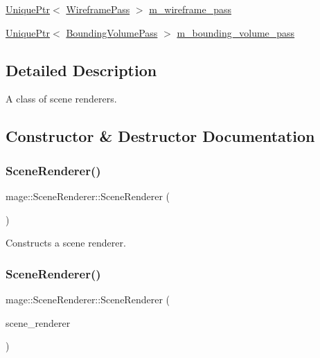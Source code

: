 \begin{DoxyCompactItemize}
\item 
\hyperlink{namespacemage_a3316d7143a973e37adf1110f2e80ca31}{Unique\+Ptr}$<$ \hyperlink{classmage_1_1_wireframe_pass}{Wireframe\+Pass} $>$ \hyperlink{classmage_1_1_scene_renderer_a3f84786f9ed001345c746292cb08ad2f}{m\+\_\+wireframe\+\_\+pass}
\item 
\hyperlink{namespacemage_a3316d7143a973e37adf1110f2e80ca31}{Unique\+Ptr}$<$ \hyperlink{classmage_1_1_bounding_volume_pass}{Bounding\+Volume\+Pass} $>$ \hyperlink{classmage_1_1_scene_renderer_a9d10194ae2ab807b241b078f8bb6430a}{m\+\_\+bounding\+\_\+volume\+\_\+pass}
\end{DoxyCompactItemize}


\subsection{Detailed Description}
A class of scene renderers. 

\subsection{Constructor \& Destructor Documentation}
\hypertarget{classmage_1_1_scene_renderer_a5d91f3c9b4e6e7c16d77a6791fadbd64}{}\label{classmage_1_1_scene_renderer_a5d91f3c9b4e6e7c16d77a6791fadbd64} 
\subsubsection{\texorpdfstring{Scene\+Renderer()}{SceneRenderer()}\hspace{0.1cm}{\footnotesize\ttfamily [1/3]}}
{\footnotesize\ttfamily mage\+::\+Scene\+Renderer\+::\+Scene\+Renderer (\begin{DoxyParamCaption}{ }\end{DoxyParamCaption})}

Constructs a scene renderer. \hypertarget{classmage_1_1_scene_renderer_a9ea97945a7675ef805f00fb437a3d1aa}{}\label{classmage_1_1_scene_renderer_a9ea97945a7675ef805f00fb437a3d1aa} 
\subsubsection{\texorpdfstring{Scene\+Renderer()}{SceneRenderer()}\hspace{0.1cm}{\footnotesize\ttfamily [2/3]}}
{\footnotesize\ttfamily mage\+::\+Scene\+Renderer\+::\+Scene\+Renderer (\begin{DoxyParamCaption}\item[{const \hyperlink{classmage_1_1_scene_renderer}{Scene\+Renderer} \&}]{scene\+\_\+renderer }\end{DoxyParamCaption})\hspace{0.3cm}{\ttfamily [delete]}}

